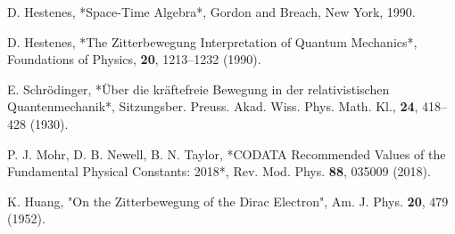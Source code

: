 \documentclass[12pt]{article}
\begin{document}
\begin{thebibliography}{9}

D. Hestenes, *Space-Time Algebra*, Gordon and Breach, New York, 1990.

D. Hestenes, *The Zitterbewegung Interpretation of Quantum Mechanics*, Foundations of Physics, \textbf{20}, 1213–1232 (1990).

E. Schrödinger, *Über die kräftefreie Bewegung in der relativistischen Quantenmechanik*, Sitzungsber. Preuss. Akad. Wiss. Phys. Math. Kl., \textbf{24}, 418–428 (1930).

P. J. Mohr, D. B. Newell, B. N. Taylor, *CODATA Recommended Values of the Fundamental Physical Constants: 2018*, Rev. Mod. Phys. \textbf{88}, 035009 (2018).

K. Huang, "On the Zitterbewegung of the Dirac Electron", Am. J. Phys. \textbf{20}, 479 (1952).

\end{thebibliography}
\end{document}
